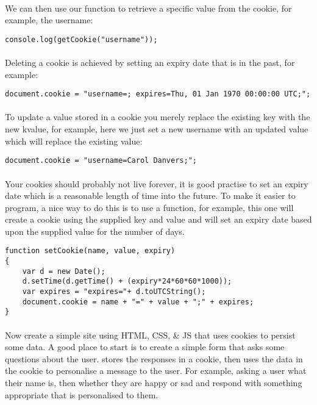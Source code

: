 \documentclass[10pt, a4paper, twosize]{article}
\begin{document}
\paragraph{} We can then use our function to retrieve a specific value from the cookie, for example, the username:

\begin{lstlisting}
console.log(getCookie("username"));
\end{lstlisting}

\paragraph{} Deleting a cookie is achieved by setting an expiry date that is in the past, for example:

\begin{lstlisting}
document.cookie = "username=; expires=Thu, 01 Jan 1970 00:00:00 UTC;";
\end{lstlisting}


\paragraph{} To update a value stored in a cookie you merely replace the existing key with the new kvalue, for example, here we just set a new username with an updated value which will replace the existing value:
\begin{lstlisting}
document.cookie = "username=Carol Danvers;";
\end{lstlisting}

\paragraph{} Your cookies should probably not live forever, it is good practise to set an expiry date which is a reasonable length of time into the future. To make it easier to program, a nice way to do this is to use a function, for example, this one will create a cookie using the supplied key and value and will set an expiry date based upon the supplied value for the number of days.

\begin{lstlisting}
function setCookie(name, value, expiry)
{
    var d = new Date();
    d.setTime(d.getTime() + (expiry*24*60*60*1000));
    var expires = "expires="+ d.toUTCString();
    document.cookie = name + "=" + value + ";" + expires;
}
\end{lstlisting}

\paragraph{} Now create a simple site using HTML, CSS, \& JS that uses cookies to persist some data. A good place to start is to create a simple form that asks some questions about the user. stores the responses in a cookie, then uses the data in the cookie to personalise a message to the user. For example, asking a user what their name is, then whether they are happy or sad and respond with something appropriate that is personalised to them.
\end{document}
